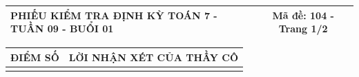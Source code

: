 \documentclass[12pt,a4paper]{article}
\begin{document}
\newpage
\noindent
\begin{tabularx}{\linewidth}{|X|c|}
\hline
\textbf{PHIẾU KIỂM TRA ĐỊNH KỲ TOÁN 7 - TUẦN 09 - BUỔI 01} & \textbf{Mã đề: 104 - Trang 1/2} \\
\hline
\end{tabularx}

\vspace{1.2mm}

\noindent
\begin{tabularx}{\linewidth}{|p{3.2cm}|X|}
\hline
\centering\textbf{ĐIỂM SỐ} & \centering\textbf{LỜI NHẬN XÉT CỦA THẦY CÔ} \tabularnewline
\hline
\rule{0pt}{1.8cm} & \tabularnewline
\hline
\end{tabularx}
\end{document}
